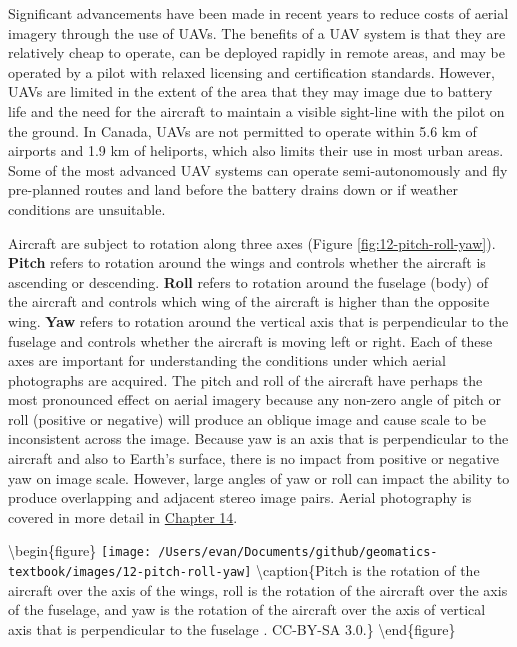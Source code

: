 \documentclass[
]{book}
\begin{document}
Significant advancements have been made in recent years to reduce costs of aerial imagery through the use of UAVs. The benefits of a UAV system is that they are relatively cheap to operate, can be deployed rapidly in remote areas, and may be operated by a pilot with relaxed licensing and certification standards. However, UAVs are limited in the extent of the area that they may image due to battery life and the need for the aircraft to maintain a visible sight-line with the pilot on the ground. In Canada, UAVs are not permitted to operate within 5.6 km of airports and 1.9 km of heliports, which also limits their use in most urban areas. Some of the most advanced UAV systems can operate semi-autonomously and fly pre-planned routes and land before the battery drains down or if weather conditions are unsuitable.

Aircraft are subject to rotation along three axes (Figure \ref{fig:12-pitch-roll-yaw}). \textbf{Pitch} refers to rotation around the wings and controls whether the aircraft is ascending or descending. \textbf{Roll} refers to rotation around the fuselage (body) of the aircraft and controls which wing of the aircraft is higher than the opposite wing. \textbf{Yaw} refers to rotation around the vertical axis that is perpendicular to the fuselage and controls whether the aircraft is moving left or right. Each of these axes are important for understanding the conditions under which aerial photographs are acquired. The pitch and roll of the aircraft have perhaps the most pronounced effect on aerial imagery because any non-zero angle of pitch or roll (positive or negative) will produce an oblique image and cause scale to be inconsistent across the image. Because yaw is an axis that is perpendicular to the aircraft and also to Earth's surface, there is no impact from positive or negative yaw on image scale. However, large angles of yaw or roll can impact the ability to produce overlapping and adjacent stereo image pairs. Aerial photography is covered in more detail in \href{https://ubc-geomatics-textbook.github.io/geomatics-textbook/image-analysis.html}{Chapter 14}.

\textbackslash begin\{figure\}
\texttt{[image: /Users/evan/Documents/github/geomatics-textbook/images/12-pitch-roll-yaw]} \textbackslash caption\{Pitch is the rotation of the aircraft over the axis of the wings, roll is the rotation of the aircraft over the axis of the fuselage, and yaw is the rotation of the aircraft over the axis of vertical axis that is perpendicular to the fuselage \citep{jrvz_image_2010}. CC-BY-SA 3.0.\}\label{fig:12-pitch-roll-yaw}
\textbackslash end\{figure\}
\end{document}
